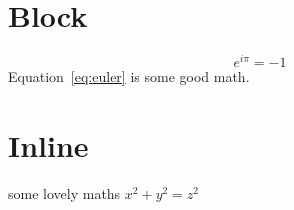 \documentclass{article}
\begin{document}
  \section{Block}

  \begin{equation}
    e^{i\pi}=-1
    \label{eq:euler}
  \end{equation}
  Equation~\ref{eq:euler} is some good math.

  \section{Inline}

  some lovely maths \(x^2 + y^2 = z^2\)
\end{document}
